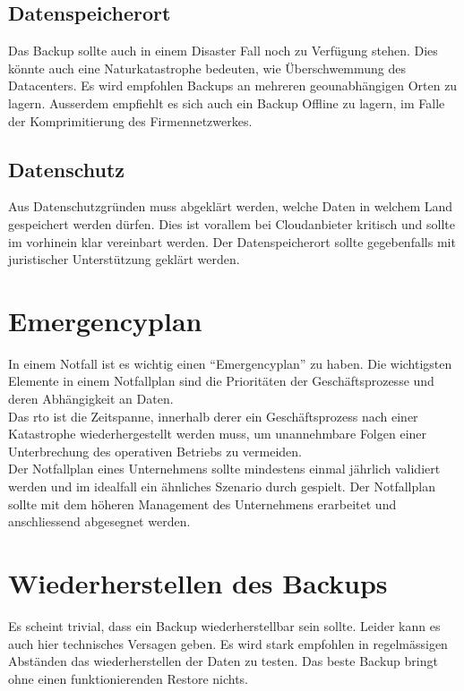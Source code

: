 \subsection{Datenspeicherort}
Das Backup sollte auch in einem Disaster Fall noch zu Verfügung stehen.
Dies könnte auch eine Naturkatastrophe bedeuten, wie Überschwemmung des Datacenters.
Es wird empfohlen Backups an mehreren geounabhängigen Orten zu lagern.
Ausserdem empfiehlt es sich auch ein Backup Offline zu lagern, im Falle der Komprimitierung des Firmennetzwerkes.



\subsection{Datenschutz}
Aus Datenschutzgründen muss abgeklärt werden, welche Daten in welchem Land gespeichert werden dürfen.
Dies ist vorallem bei Cloudanbieter kritisch und sollte im vorhinein klar vereinbart werden.
Der Datenspeicherort sollte gegebenfalls mit juristischer Unterstützung geklärt werden.

\section{Emergencyplan}
In einem Notfall ist es wichtig einen ``Emergencyplan'' zu haben.
Die wichtigsten Elemente in einem Notfallplan sind die Prioritäten der Geschäftsprozesse und deren Abhängigkeit an Daten.\\


Das \acrfull{rto} ist die Zeitspanne, innerhalb derer ein Geschäftsprozess nach einer Katastrophe wiederhergestellt werden muss, um unannehmbare Folgen einer Unterbrechung des operativen Betriebs zu vermeiden.\\

Der Notfallplan eines Unternehmens sollte mindestens einmal jährlich validiert werden und im idealfall ein ähnliches Szenario durch gespielt.
Der Notfallplan sollte mit dem höheren Management des Unternehmens erarbeitet und anschliessend abgesegnet werden.


\section{Wiederherstellen des Backups}
Es scheint trivial, dass ein Backup wiederherstellbar sein sollte.
Leider kann es auch hier technisches Versagen geben.
Es wird stark empfohlen in regelmässigen Abständen das wiederherstellen der Daten zu testen.
Das beste Backup bringt ohne einen funktionierenden Restore nichts.